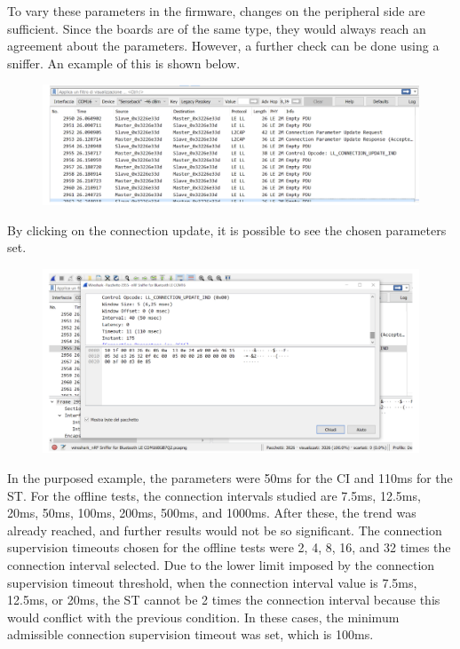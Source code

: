 \documentclass{Configuration_Files/PoliMi3i_thesis}
\begin{document}
To vary these parameters in the firmware, changes on the peripheral side are sufficient. Since the boards are of the same type, they would always reach an agreement about the parameters. However, a further check can be done using a sniffer. An example of this is shown below.

\begin{figure}[H]
    \centering
    \includegraphics[scale=0.3]{Test_Procedure/2.png}
    \label{fig:sniffed_connection_parameter_update}
\end{figure}

By clicking on the connection update, it is possible to see the chosen parameters set.

\begin{figure}[H]
    \centering
    \includegraphics{Test_Procedure/3.png}
    \label{fig:connection_parameters_wireshark}
\end{figure}

In the purposed example, the parameters were 50ms for the CI and 110ms for the ST. For the offline tests, the connection intervals studied are 7.5ms, 12.5ms, 20ms, 50ms, 100ms, 200ms, 500ms, and 1000ms. After these, the trend was already reached, and further results would not be so significant. The connection supervision timeouts chosen for the offline tests were 2, 4, 8, 16, and 32 times the connection interval selected. Due to the lower limit imposed by the connection supervision timeout threshold, when the connection interval value is 7.5ms, 12.5ms, or 20ms, the ST cannot be 2 times the connection interval because this would conflict with the previous condition. In these cases, the minimum admissible connection supervision timeout was set, which is 100ms.
\end{document}
